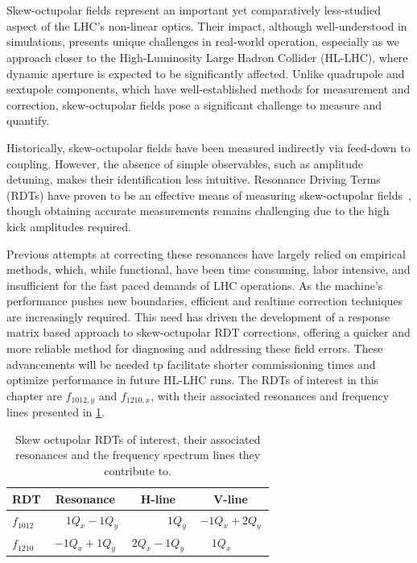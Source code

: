 \section{}

Skew-octupolar fields represent an important yet comparatively less-studied aspect of the LHC's
non-linear optics. Their impact, although well-understood in simulations, presents unique challenges
in real-world operation, especially as we approach closer to the High-Luminosity Large Hadron
Collider (HL-LHC), where dynamic aperture is expected to be significantly affected. Unlike
quadrupole and sextupole components, which have well-established methods for measurement and
correction, skew-octupolar fields pose a significant challenge to measure and quantify.

Historically, skew-octupolar fields have been measured indirectly via feed-down to coupling.
However, the absence of simple observables, such as amplitude detuning, makes their identification
less intuitive. Resonance Driving Terms (RDTs) have proven to be an effective means of measuring
skew-octupolar fields~\cite{carlier_nonlinear_2020}, though obtaining accurate measurements remains
challenging due to the high kick amplitudes required. 

Previous attempts at correcting these resonances have largely relied on empirical methods, which,
while functional, have been time consuming, labor intensive, and insufficient for the fast paced
demands of LHC operations. As the machine's performance pushes new boundaries, efficient and
realtime correction techniques are increasingly required. This need has driven the development of a
response matrix based approach to skew-octupolar RDT corrections, offering a quicker and more
reliable method for diagnosing and addressing these field errors. These advancements will be needed
tp facilitate shorter commissioning times and optimize performance in future HL-LHC runs.
The RDTs of interest in this chapter are $f_{1012,y}$ and $f_{1210,x}$, with their associated
resonances and frequency lines presented in \cref{tab:skew_octupolar:resonances_rdts}.

\begin{table}[!htb]
    \centering
    \begin{tabular}{lccc}
      \toprule
      RDT         & Resonance                &  H-line                    & V-line         \\
      \midrule
      $f_{1012}$  & $\phantom{-}1Q_x - 1Q_y$ &  $\phantom{2Q_x-\ \,}1Q_y$ & $-1Q_x + 2Q_y$ \\
      $f_{1210}$  & $-1Q_x + 1Q_y$           &  $2Q_x - 1Q_y$             & $\phantom{-}1Q_x\phantom{+2Q_y\ \,}$    \\
      \bottomrule
    \end{tabular}
    \caption{Skew octupolar RDTs of interest, their associated resonances and the frequency spectrum
    lines they contribute to.}
    \label{tab:skew_octupolar:resonances_rdts}
\end{table}

